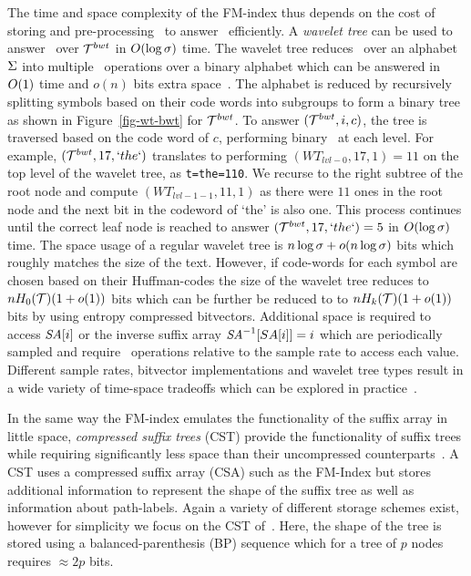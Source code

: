 The time and space complexity of the FM-index thus depends on the cost of storing
and pre-processing \colbwt\ to answer \rankop\ efficiently. A {\it wavelet tree}
can be used to answer \rankop\ over $\mathcal{T}^{bwt}$ in $O(\log \sigma)$ time.
The wavelet tree reduces \rankop\ over an alphabet $\Sigma$ into multiple
\rankop\ operations over a binary alphabet which can be answered 
in $O(1)$ time and $o(n)$ bits extra space~\cite{m-fsttcs96}. The alphabet is
reduced by recursively splitting symbols based on their code words into subgroups to 
form a binary tree as shown in Figure~\ref{fig-wt-bwt} for $\mathcal{T}^{bwt}$. To answer
\rankop$(\mathcal{T}^{bwt},i,c)$, the tree is traversed based on the code word of $c$, performing
binary \rankop\ at each level. For example, \rankop$(\mathcal{T}^{bwt},17,`the`)$ translates
to performing \rankop$(WT_{lvl-0},17,1)=11$ on the top level of the wavelet 
tree, as {\tt t=the=110}. We recurse to the right subtree of the root node and
compute \rankop$(WT_{lvl-1-1},11,1)$ as there were $11$ ones in the root node and
the next bit in the codeword of `the' is also one. This process continues until 
the correct leaf node is reached to answer \rankop$(\mathcal{T}^{bwt},17,`the`)=5$ in 
$O(\log \sigma)$ time. The space usage of a regular wavelet tree is
$n \log \sigma + o(n \log \sigma)$ bits which roughly
matches the size of the text. However, if code-words for each symbol are chosen
based on their Huffman-codes the size of the wavelet tree reduces to $nH_0(\mathcal{T})(1 + o(1))$
bits which can be further be reduced to to $nH_k(\mathcal{T})(1 + o(1))$ bits by using 
entropy compressed bitvectors. Additional space is required to access $\mbox{\emph{SA}}[i]$
or the inverse suffix array $\mbox{\emph{SA}}^{-1}[SA[i]]=i$ which are periodically sampled
and require \rankop\ operations relative to the sample rate to access each value.
Different sample rates, bitvector implementations and wavelet tree types result
in a wide variety of time-space tradeoffs which can be explored 
in practice~\cite{gbmp2014sea}.

In the same way the FM-index emulates the functionality of the suffix array in
little space, {\it compressed suffix trees} (CST) provide the functionality
of suffix trees while requiring significantly less space than their uncompressed
counterparts~\cite{ofg-spire10}. A CST uses a compressed suffix array (CSA) such
as the FM-Index but stores additional information to represent the shape of
the suffix tree as well as information about path-labels. Again a variety
of different storage schemes exist, however for simplicity we focus on
the CST of~. Here, the shape of the tree
is stored using a balanced-parenthesis (BP) sequence which for a tree of $p$ nodes
requires $\approx 2p$ bits.
